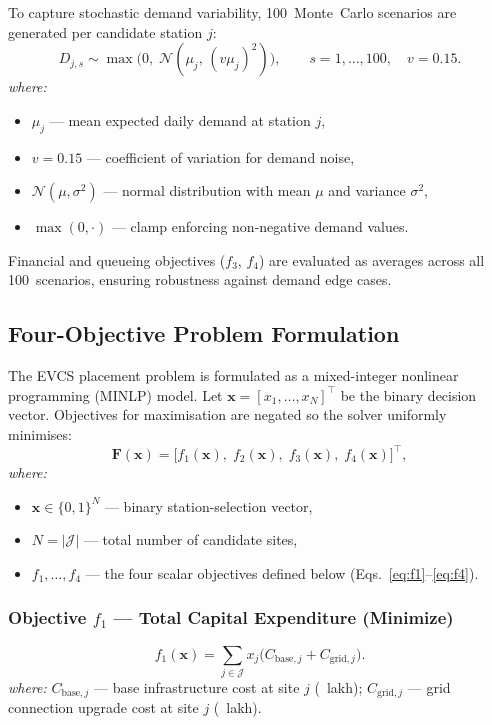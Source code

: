 \medskip\noindent
To capture stochastic demand variability, 100~Monte~Carlo scenarios are
generated per candidate station $j$:
\begin{equation}
D_{j,s}
\sim \max\!\bigl(0,\;\mathcal{N}(\mu_j,\,(v\mu_j)^2)\bigr),
\qquad s = 1,\dots,100,\quad v = 0.15.
\label{eq:mc}
\end{equation}
\textit{where:}
\begin{itemize}
  \item $\mu_j$ — mean expected daily demand at station $j$,
  \item $v = 0.15$ — coefficient of variation for demand noise,
  \item $\mathcal{N}(\mu,\sigma^2)$ — normal distribution with mean $\mu$
        and variance $\sigma^2$,
  \item $\max(0,\cdot)$ — clamp enforcing non-negative demand values.
\end{itemize}
Financial and queueing objectives ($f_3$, $f_4$) are evaluated as averages
across all 100~scenarios, ensuring robustness against demand edge cases.

\subsection{Four-Objective Problem Formulation}
\label{sec:four_obj}

The EVCS placement problem is formulated as a mixed-integer nonlinear
programming (MINLP) model. Let $\mathbf{x} = [x_1,\dots,x_N]^{\top}$
be the binary decision vector. Objectives for maximisation are negated so
the solver uniformly minimises:
\begin{equation}
\mathbf{F}(\mathbf{x})
= \bigl[f_1(\mathbf{x}),\;f_2(\mathbf{x}),\;f_3(\mathbf{x}),\;
         f_4(\mathbf{x})\bigr]^{\!\top},
\label{eq:objvec}
\end{equation}
\textit{where:}
\begin{itemize}
  \item $\mathbf{x} \in \{0,1\}^N$ — binary station-selection vector,
  \item $N = |\mathcal{J}|$ — total number of candidate sites,
  \item $f_1,\ldots,f_4$ — the four scalar objectives defined below
        (Eqs.~\eqref{eq:f1}--\eqref{eq:f4}).
\end{itemize}

\subsubsection*{Objective $f_1$ — Total Capital Expenditure (Minimize)}
\begin{equation}
f_1(\mathbf{x})
= \sum_{j \in \mathcal{J}} x_j
  \bigl(C_{\mathrm{base},j} + C_{\mathrm{grid},j}\bigr).
\label{eq:f1}
\end{equation}
\textit{where:} $C_{\mathrm{base},j}$ — base infrastructure cost at site
$j$ (\rupee\ lakh); $C_{\mathrm{grid},j}$ — grid connection upgrade cost
at site $j$ (\rupee\ lakh).

